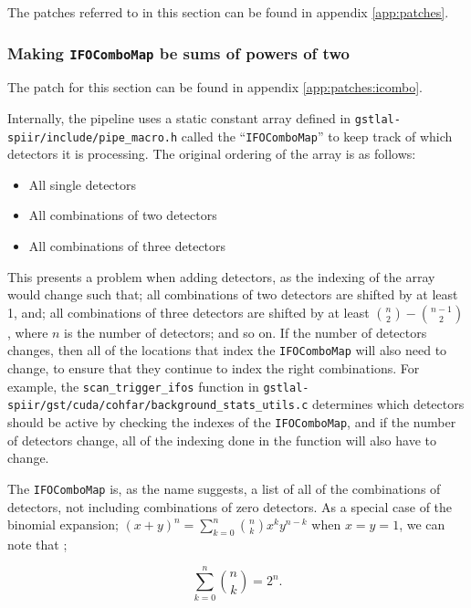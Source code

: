 \documentclass{article}
\begin{document}
The patches referred to in this section can be found in appendix \ref{app:patches}.

\subsubsection{Making \texttt{IFOComboMap} be sums of powers of two} \label{sec:final_design:patches:ifocombo}

The patch for this section can be found in appendix \ref{app:patches:icombo}.

Internally, the pipeline uses a static constant array defined in \texttt{gstlal-spiir/include/pipe\_macro.h} called the ``\texttt{IFOComboMap}'' to keep track of which detectors it is processing.
The original ordering of the array is as follows:
\begin{itemize}
    \item All single detectors
    \item All combinations of two detectors
    \item All combinations of three detectors
\end{itemize}

This presents a problem when adding detectors, as the indexing of the array would change such that; all combinations of two detectors are shifted by at least 1, and; all combinations of three detectors are shifted by at least \(\binom{n}{2}-\binom{n-1}{2}\), where \(n\) is the number of detectors; and so on.
If the number of detectors changes, then all of the locations that index the \texttt{IFOComboMap} will also need to change, to ensure that they continue to index the right combinations.
For example, the \texttt{scan\_trigger\_ifos} function in \texttt{gstlal-spiir/gst/cuda/cohfar/background\_stats\_utils.c} determines which detectors should be active by checking the indexes of the \texttt{IFOComboMap}, and if the number of detectors change, all of the indexing done in the function will also have to change.

The \texttt{IFOComboMap} is, as the name suggests, a list of all of the combinations of detectors, not including combinations of zero detectors.
As a special case of the binomial expansion;
\( (x + y)^n = \sum^n_{k=0}\binom{n}{k}x^ky^{n-k} \) when \(x = y = 1\), we can note that \cite{CLRS_combinations};

\begin{equation}
    \label{eq:power2}
    \sum^n_{k=0}\binom{n}{k} = 2^n.
\end{equation}
\end{document}

